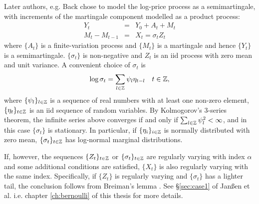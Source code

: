Later authors, e.g. Back \cite{back:1991} chose to model the log-price
process as a semimartingale, with increments of the martingale
component modelled as a product process:
\begin{eqnarray}
  Y_t &=& Y_0 + A_t + M_t \nonumber \\
  M_t - M_{t-1} &=& X_t = \sigma_t Z_t
  \label{eq:rtght}
\end{eqnarray}
where $\{A_t\}$ is a finite-variation process and $\{M_t\}$ is a
martingale and hence $\{Y_t\}$ is a semimartingale.
$\{\sigma_t\}$ is non-negative and $Z_t$ is an iid process with zero mean
and unit variance. A convenient choice of $\sigma_t$ is
\begin{equation}
  \label{eq:rfht}
  \log\sigma_t = \sum_{l \in \mathbb Z} \psi_l \eta_{t-l}
  \quad
  t \in \mathbb Z,
\end{equation}
where $\{\psi_l\}_{l \in \mathbb Z}$ is a sequence of real numbers
with at least one non-zero element,
$\{\eta_t\}_{t \in \mathbb Z}$ is an iid sequence of random
variables. By Kolmogorov's 3-series theorem, the infinite series above
converges if and only if $\sum_{l \in \mathbb Z} \psi_l^2 < \infty$,
and in this case $\{\sigma_{t}\}$ is stationary.
In particular, if $\{\eta_i\}_{i \in \mathbb Z}$ is normally
distributed with zero mean, $\{\sigma_t\}_{t \in \mathbb Z}$ has
log-normal marginal distributions.

If, however, the sequences $\{Z_t\}_{t \in \mathbb Z}$ or
$\{\sigma_t\}_{t \in \mathbb Z}$ are regularly varying with index
$\alpha$ and some additional conditions are satisfied, $\{X_t\}$
is also regularly varying with the same index. Specifically,
if $\{Z_t\}$ is regularly varying and $\{\sigma_t\}$ has a lighter
tail, the conclusion follows from Breiman's lemma \cite{breiman:1965}.
See \S\ref{sec:case1} of Jan\ss en et al. i.e. chapter
\ref{ch:bernoulli} of this thesis for more details. 


